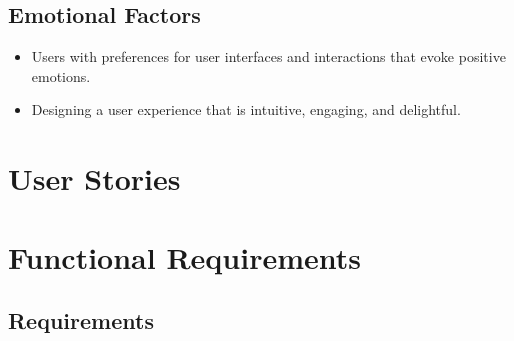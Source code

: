 \documentclass[12pt]{article}
\begin{document}
\subsection{Emotional Factors}
\begin{itemize}
  \item Users with preferences for user interfaces and interactions that evoke positive emotions.
  \item Designing a user experience that is intuitive, engaging, and delightful.
\end{itemize}

\newpage
















\section{User Stories}

\newpage

\section{Functional Requirements}

\subsection{Requirements}
\end{document}
